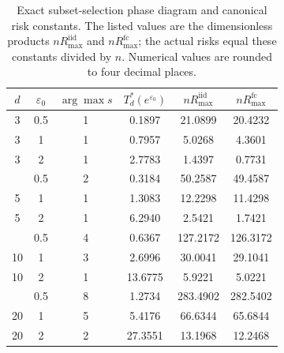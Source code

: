 \documentclass[11pt]{amsart}
\theoremstyle{definition}
\begin{document}
\begin{table}[ht]
\centering
\small
\caption{Exact subset-selection phase diagram and canonical risk constants. The listed values are the dimensionless products $nR_{\max}^{\mathrm{iid}}$ and $nR_{\max}^{\mathrm{fc}}$; the actual risks equal these constants divided by $n$. Numerical values are rounded to four decimal places.}
\label{tab:raw-phase}
\begin{tabular}{@{}cccccc@{}}
\toprule
$d$ & $\varepsilon_0$ & $\arg\max s$ & $T_d^*(e^{\varepsilon_0})$ & $nR_{\max}^{\mathrm{iid}}$ & $nR_{\max}^{\mathrm{fc}}$ \\
\midrule
3 & 0.5 & 1 & 0.1897 & 21.0899 & 20.4232 \\
3 & 1 & 1 & 0.7957 & 5.0268 & 4.3601 \\
3 & 2 & 1 & 2.7783 & 1.4397 & 0.7731 \\
\addlinespace
5 & 0.5 & 2 & 0.3184 & 50.2587 & 49.4587 \\
5 & 1 & 1 & 1.3083 & 12.2298 & 11.4298 \\
5 & 2 & 1 & 6.2940 & 2.5421 & 1.7421 \\
\addlinespace
10 & 0.5 & 4 & 0.6367 & 127.2172 & 126.3172 \\
10 & 1 & 3 & 2.6996 & 30.0041 & 29.1041 \\
10 & 2 & 1 & 13.6775 & 5.9221 & 5.0221 \\
\addlinespace
20 & 0.5 & 8 & 1.2734 & 283.4902 & 282.5402 \\
20 & 1 & 5 & 5.4176 & 66.6344 & 65.6844 \\
20 & 2 & 2 & 27.3551 & 13.1968 & 12.2468 \\
\bottomrule
\end{tabular}
\end{table}
\end{document}
